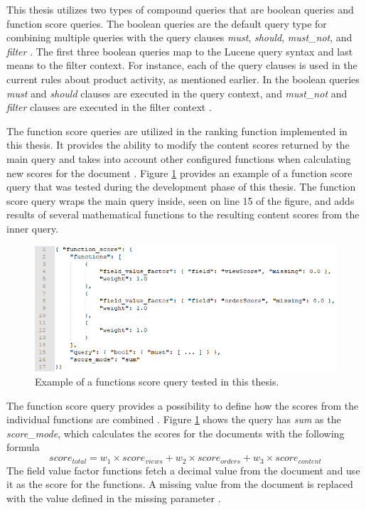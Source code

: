 This thesis utilizes two types of compound queries that are boolean queries and function score queries.
The boolean queries are the default query type for combining multiple queries with the query clauses 
\emph{must}, \emph{should}, \emph{must\_not}, and \emph{filter} \cite{elasticIntro}.
The first three boolean queries map to the Lucene query syntax and last means to the filter context. 
For instance, each of the query clauses is used in the current rules about product activity, as mentioned
earlier.
In the boolean queries \emph{must} and \emph{should} clauses are executed in the query context, 
and \emph{must\_not} and \emph{filter} clauses are executed in the filter context \cite{elasticIntro}.


The function score queries are utilized in the ranking function implemented in this thesis.
It provides the ability to modify the content scores returned by the main query and
takes into account other configured functions when calculating new scores for the document \cite{elasticIntro}.
Figure \ref{fig:function_score} provides an example of a function score query that was tested 
during the development phase of this thesis.
The function score query wraps the main query inside, seen on line 15 of the figure, 
and adds results of several mathematical functions to the resulting content scores from the inner query.


\begin{figure}
    \centering
    \includegraphics[width=\textwidth]{img/function_score.png}
    \caption{Example of a functions score query tested in this thesis.}
    \label{fig:function_score}
\end{figure}


The function score query provides a possibility to define
how the scores from the individual functions are combined \cite{relevantSearch}.
Figure \ref{fig:function_score} shows the query has \emph{sum} as the \emph{score\_mode}, which calculates
the scores for the documents with the following formula \cite{relevantSearch}
\[ score_{total} = w_1 \times score_{views} + w_2 \times score_{orders} + w_3 \times score_{content} \]
The field value factor functions fetch a decimal value from the document and use it as the score
for the functions. A missing value from the document is replaced
with the value defined in the missing parameter \cite{elasticIntro}.


